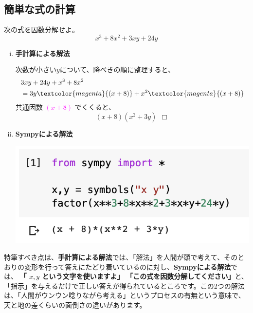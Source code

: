 \documentclass[10pt, a5paper,dvipdfmx]{jsbook}
\begin{document}
\subsection{簡単な式の計算}
\begin{framed}
\begin{exq}
次の式を因数分解せよ。
\Large
$$x^3+8x^2+3xy+24y$$
\normalsize
\end{exq}
\end{framed}
\begin{enumerate}[(i)]
    \item 
    {\bf 手計算による解法}
    
    次数が小さい$y$について、降べきの順に整理すると、
    \large
    \begin{align*}
        &3xy+24y+x^3+8x^2\\
        &= 3y\textcolor{magenta}{(x+8)}+x^2\textcolor{magenta}{(x+8)}
    \end{align*}
    \normalsize
    共通因数 
    \large
    \textcolor{magenta}
    {$(x+8)$}
    \normalsize でくくると、
    \Large
    $$(x+8)(x^2+3y)\ \ \Box$$
    \normalsize
    \item
    
    {\bf Sympyによる解法}
    \begin{center}
    \includegraphics[scale=0.9]{fig1-2-1.png}
    \end{center}
\end{enumerate}
特筆すべき点は、{\bf 手計算による解法}では、「解法」を人間が頭で考えて、そのとおりの変形を行って答えにたどり着いているのに対し、{\bf Sympyによる解法}では、
{\bf 「\large 
{$x, y$}
\normalsize
という文字を使いますよ」}
{\bf 「この式を因数分解してください」}と、「指示」を与えるだけで正しい答えが得られているところです。この2つの解法は、「人間がウンウン唸りながら考える」というプロセスの有無という意味で、天と地の差くらいの面倒さの違いがあります。
\end{document}
